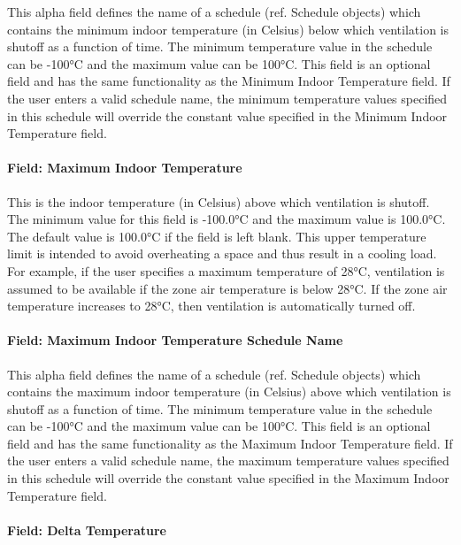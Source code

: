 This alpha field defines the name of a schedule (ref. Schedule objects) which contains the minimum indoor temperature (in Celsius) below which ventilation is shutoff as a function of time. The minimum temperature value in the schedule can be -100°C and the maximum value can be 100°C. This field is an optional field and has the same functionality as the Minimum Indoor Temperature field. If the user enters a valid schedule name, the minimum temperature values specified in this schedule will override the constant value specified in the Minimum Indoor Temperature field.

\paragraph{Field: Maximum Indoor Temperature}\label{field-maximum-indoor-temperature-1}

This is the indoor temperature (in Celsius) above which ventilation is shutoff. The minimum value for this field is -100.0°C and the maximum value is 100.0°C. The default value is 100.0°C if the field is left blank. This upper temperature limit is intended to avoid overheating a space and thus result in a cooling load. For example, if the user specifies a maximum temperature of 28°C, ventilation is assumed to be available if the zone air temperature is below 28°C. If the zone air temperature increases to 28°C, then ventilation is automatically turned off.

\paragraph{Field: Maximum Indoor Temperature Schedule Name}\label{field-maximum-indoor-temperature-schedule-name-1}

This alpha field defines the name of a schedule (ref. Schedule objects) which contains the maximum indoor temperature (in Celsius) above which ventilation is shutoff as a function of time. The minimum temperature value in the schedule can be -100°C and the maximum value can be 100°C. This field is an optional field and has the same functionality as the Maximum Indoor Temperature field. If the user enters a valid schedule name, the maximum temperature values specified in this schedule will override the constant value specified in the Maximum Indoor Temperature field.

\paragraph{Field: Delta Temperature}\label{field-delta-temperature-1}


